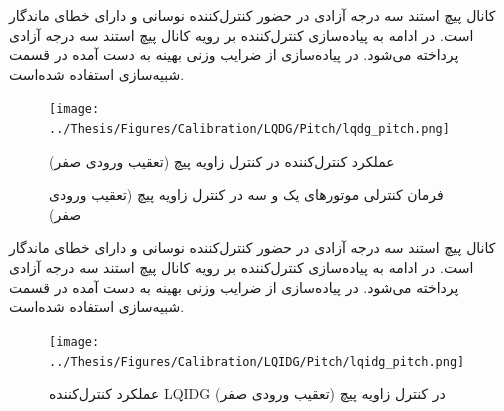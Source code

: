\documentclass{CCI2020}
\begin{document}
	کانال پیچ استند سه درجه آزادی در حضور کنترل‌کننده  نوسانی و دارای خطای ماندگار است.
	در ادامه به پیاده‌سازی کنترل‌کننده  بر رویه کانال پیچ استند سه درجه آزادی پرداخته می‌شود.
	در پیاده‌سازی از ضرایب وزنی بهینه به دست آمده در قسمت شبیه‌سازی استفاده شده‌است.
	\begin{figure}[H]
		\texttt{[image: ../Thesis/Figures/Calibration/LQDG/Pitch/lqdg\_pitch.png]}
		\centering
		\caption{عملكرد کنترل‌کننده  در کنترل زاويه پیچ (تعقیب ورودی صفر)}
	\end{figure}
	
	\begin{figure}[H]
		\centering
		\caption{فرمان کنترلی موتورهای یک و سه در کنترل زاویه پیچ (تعقیب ورودی صفر)}
	\end{figure}





کانال پیچ استند سه درجه آزادی در حضور کنترل‌کننده  نوسانی و دارای خطای ماندگار است.
در ادامه به پیاده‌سازی کنترل‌کننده  بر رویه کانال پیچ استند سه درجه آزادی پرداخته می‌شود.
در پیاده‌سازی از ضرایب وزنی بهینه به دست آمده در قسمت شبیه‌سازی استفاده شده‌است.
\begin{figure}[H]
	\texttt{[image: ../Thesis/Figures/Calibration/LQIDG/Pitch/lqidg\_pitch.png]}
	\centering
	\caption{عملكرد کنترل‌کننده  LQIDG در کنترل زاويه پیچ (تعقیب ورودی صفر)}
\end{figure}
\end{document}
